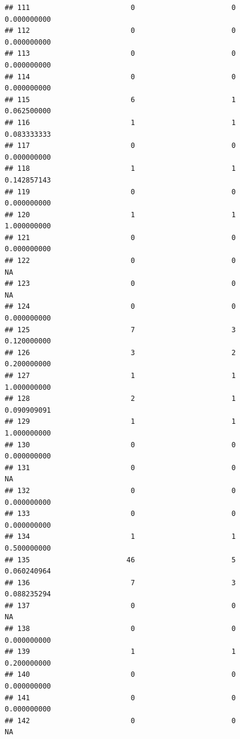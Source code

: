 \documentclass[
]{article}
\begin{document}
\begin{verbatim}
## 111                        0                       0               0.000000000
## 112                        0                       0               0.000000000
## 113                        0                       0               0.000000000
## 114                        0                       0               0.000000000
## 115                        6                       1               0.062500000
## 116                        1                       1               0.083333333
## 117                        0                       0               0.000000000
## 118                        1                       1               0.142857143
## 119                        0                       0               0.000000000
## 120                        1                       1               1.000000000
## 121                        0                       0               0.000000000
## 122                        0                       0                        NA
## 123                        0                       0                        NA
## 124                        0                       0               0.000000000
## 125                        7                       3               0.120000000
## 126                        3                       2               0.200000000
## 127                        1                       1               1.000000000
## 128                        2                       1               0.090909091
## 129                        1                       1               1.000000000
## 130                        0                       0               0.000000000
## 131                        0                       0                        NA
## 132                        0                       0               0.000000000
## 133                        0                       0               0.000000000
## 134                        1                       1               0.500000000
## 135                       46                       5               0.060240964
## 136                        7                       3               0.088235294
## 137                        0                       0                        NA
## 138                        0                       0               0.000000000
## 139                        1                       1               0.200000000
## 140                        0                       0               0.000000000
## 141                        0                       0               0.000000000
## 142                        0                       0                        NA

\end{verbatim}
\end{document}
